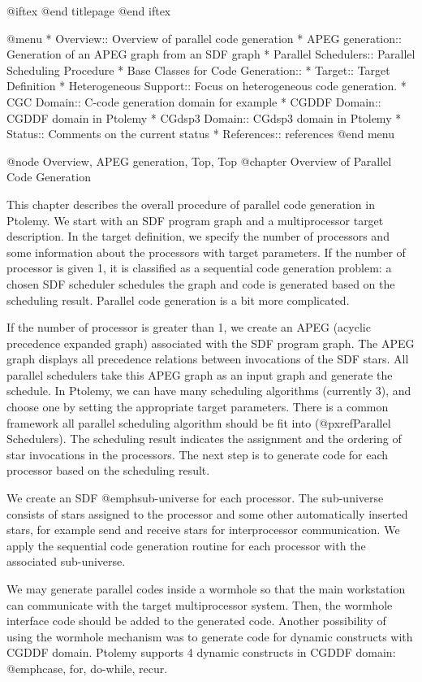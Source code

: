 @iftex
@end titlepage
@end iftex

@menu
* Overview::              	Overview of parallel code generation
* APEG generation::		Generation of an APEG graph from an SDF graph
* Parallel Schedulers::         Parallel Scheduling Procedure
* Base Classes for Code Generation:: 
* Target::          		Target Definition
* Heterogeneous Support::	Focus on heterogeneous code generation.
* CGC Domain::			C-code generation domain for example
* CGDDF Domain::		CGDDF domain in Ptolemy
* CGdsp3 Domain::		CGdsp3 domain in Ptolemy
* Status::			Comments on the current status
* References::			references
@end menu

@node Overview, APEG generation, Top, Top
@chapter Overview of Parallel Code Generation

This chapter describes the overall procedure of parallel code generation
in Ptolemy. We start with an SDF program graph and a multiprocessor
target description. In the target definition, we specify the number of
processors and some information about the processors with target parameters.
If the number of processor is given 1, it is classified as a sequential
code generation problem: a chosen
SDF scheduler schedules the graph and code is generated based on the
scheduling result. Parallel code generation is a bit more complicated.

If the number of processor is greater than 1, we create an APEG (acyclic
precedence expanded graph) associated with the SDF program graph. The APEG
graph displays all precedence relations between invocations of the SDF
stars. All parallel schedulers take this APEG graph as an input graph
and generate the schedule. In Ptolemy, we can have many scheduling
algorithms (currently 3), and choose one by setting the appropriate
target parameters. There is a common framework all parallel scheduling
algorithm should be fit into (@pxref{Parallel Schedulers}). The scheduling
result indicates the assignment and the ordering of star invocations
in the processors. The next step is to generate code for each processor
based on the scheduling result.

We create an SDF @emph{sub-universe} for each processor. The sub-universe
consists of stars assigned to the processor and some other automatically
inserted stars, for example send and receive stars for interprocessor
communication. We apply the sequential code generation routine for
each processor with the associated sub-universe.

We may generate parallel codes inside a wormhole so that the main
workstation can communicate with the target multiprocessor system. 
Then, the wormhole interface code should be added to the generated code.
Another possibility of using the wormhole mechanism was to generate code
for dynamic constructs with CGDDF domain. Ptolemy supports 4 dynamic 
constructs in CGDDF domain: @emph{case, for, do-while, recur}.

